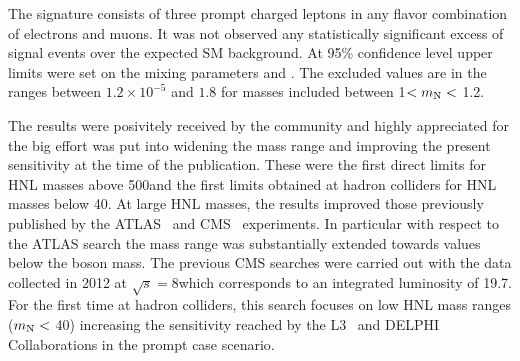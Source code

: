 The signature consists of three prompt charged leptons in any flavor combination of electrons
and muons.
It was not observed any statistically significant excess of signal events over the expected
SM background. At 95\% confidence level upper limits were set on the mixing
parameters \mixpare and \mixparm. The excluded values are in the
ranges between $1.2\times 10^{-5}$ and $1.8$ for masses included
between 1\GeV $< m_\mathrm{N} <$ 1.2\TeV. 

The results were posivitely received by the community and highly appreciated
for the big effort was put into widening the mass range and
improving the present sensitivity at the time of the publication.
These were the first direct limits for HNL masses above 500\GeV and the first
limits obtained at hadron colliders for HNL masses below 40\GeV.
At large HNL masses, the results improved those previously published
by the ATLAS~\cite{Aad_2015} and CMS~\cite{Khachatryan_2015,Sirunyan:2018xiv}
experiments. In particular with respect to the ATLAS search the mass
range was substantially extended towards values below the \PW boson
mass. The previous CMS searches were carried out with the data
collected in 2012 at $\sqrt{s} = 8$\TeV which corresponds to an
integrated luminosity of 19.7\fbinv. 
For the first time at hadron colliders, this search focuses on low HNL mass ranges
($ m_\mathrm{N} < $ 40\GeV) increasing the sensitivity reached by the
L3~\cite{ACHARD200167} and DELPHI~\cite{Abreu:1996pa} Collaborations
in the prompt case scenario.\\


